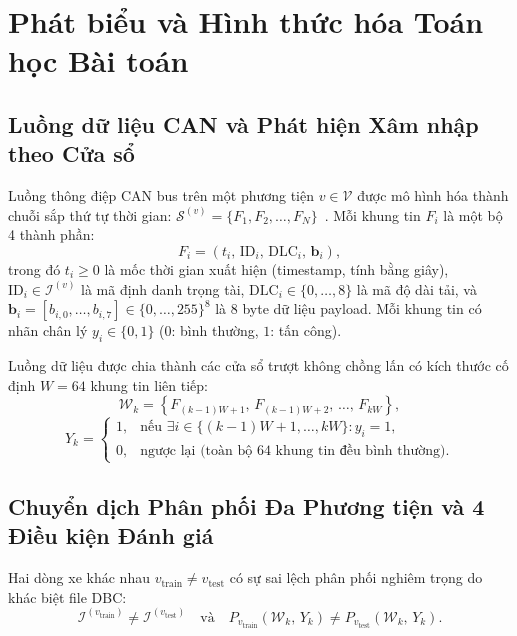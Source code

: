 \documentclass[12pt, a4paper, reqno, oneside]{book}
\begin{document}
\section{Phát biểu và Hình thức hóa Toán học Bài toán}
\label{subsec:problem_formulation}

\subsection{Luồng dữ liệu CAN và Phát hiện Xâm nhập theo Cửa sổ}
Luồng thông điệp CAN bus trên một phương tiện $v \in \mathcal{V}$ được mô hình hóa thành chuỗi sắp thứ tự thời gian: $\mathcal{S}^{(v)} = \{F_1, F_2, \dots, F_N\}$~\cite{song2020invehicle,lee2017otids}. Mỗi khung tin $F_i$ là một bộ 4 thành phần:
\begin{equation}
    F_i = \left( t_i,\, \text{ID}_i,\, \text{DLC}_i,\, \mathbf{b}_i \right),
\end{equation}
trong đó $t_i \ge 0$ là mốc thời gian xuất hiện (timestamp, tính bằng giây), $\text{ID}_i \in \mathcal{I}^{(v)}$ là mã định danh trọng tài, $\text{DLC}_i \in \{0, \dots, 8\}$ là mã độ dài tải, và $\mathbf{b}_i = [b_{i,0}, \dots, b_{i,7}] \in \{0, \dots, 255\}^8$ là 8 byte dữ liệu payload. Mỗi khung tin có nhãn chân lý $y_i \in \{0, 1\}$ ($0$: bình thường, $1$: tấn công).

Luồng dữ liệu được chia thành các cửa sổ trượt không chồng lấn có kích thước cố định $W = 64$ khung tin liên tiếp:
\begin{equation}
    \mathcal{W}_k = \left\{ F_{(k-1)W + 1},\, F_{(k-1)W + 2},\, \dots,\, F_{kW} \right\},
\end{equation}
\begin{equation}
    Y_k = \begin{cases} 
        1, & \text{nếu } \exists i \in \{(k-1)W+1, \dots, kW\}: y_i = 1, \\
        0, & \text{ngược lại (toàn bộ 64 khung tin đều bình thường)}.
    \end{cases}
\end{equation}

\subsection{Chuyển dịch Phân phối Đa Phương tiện và 4 Điều kiện Đánh giá}
Hai dòng xe khác nhau $v_{\text{train}} \neq v_{\text{test}}$ có sự sai lệch phân phối nghiêm trọng do khác biệt file DBC:
\begin{equation}
    \mathcal{I}^{(v_{\text{train}})} \neq \mathcal{I}^{(v_{\text{test}})} \quad \text{và} \quad P_{v_{\text{train}}}\!\left(\mathcal{W}_k,\, Y_k\right) \neq P_{v_{\text{test}}}\!\left(\mathcal{W}_k,\, Y_k\right).
\end{equation}
\end{document}

